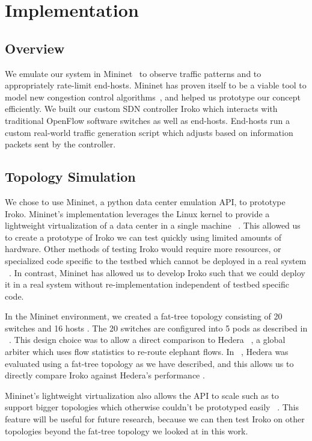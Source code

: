 

\section{Implementation}
\subsection{Overview}

We emulate our system in Mininet~\cite{mininet} to observe traffic 
patterns and to appropriately rate-limit end-hosts. Mininet has proven itself to be 
a viable tool to model new congestion control 
algorithms~\cite{mininet_learning}, and helped us prototype our concept 
efficiently. We built our custom SDN controller Iroko which interacts with 
traditional OpenFlow software switches as well as end-hosts. End-hosts run 
a custom real-world traffic generation script which adjusts based on 
information packets sent by the controller.


\subsection{Topology Simulation}
We chose to use  Mininet, a python data center emulation API, to prototype Iroko. Mininet's implementation leverages the Linux kernel to provide a lightweight virtualization of a data center in a single machine ~\cite{mininet}. This allowed us to create a prototype of Iroko we can test quickly using limited amounts of hardware. Other methods of testing Iroko would require more resources, or specialized code specific to the testbed which cannot be deployed in a real system ~\cite{mininet}. In contrast, Mininet has allowed us to develop Iroko such that we could deploy it in a real system without re-implementation independent of testbed specific code. 

In the Mininet environment, we created a fat-tree topology consisting of 20 switches and 16 hosts . The 20 switches are configured into 5 pods as described in ~\cite{fattree}. This design choice was to allow a direct comparison to Hedera  ~\cite{hedera}, a global arbiter which uses flow statistics to re-route elephant flows. In ~\cite{hedera}, Hedera was evaluated  using a fat-tree topology as we have described, and this allows us to directly compare Iroko against Hedera's performance . 

Mininet’s lightweight virtualization also allows the API to scale such as to support bigger topologies which otherwise couldn’t be prototyped easily ~\cite{mininet}. This feature will be useful for future research, because we can then test Iroko on other topologies beyond the fat-tree topology we looked at in this work. 


